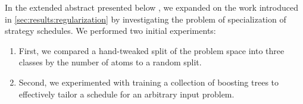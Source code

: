 In the extended abstract presented below \cite{DBLP:conf/paar/BartekC024},
we expanded on the work introduced in \cref{sec:results:regularization}
by investigating the problem of specialization of strategy schedules.
We performed two initial experiments:
\begin{enumerate}
\item First, we compared a hand-tweaked split of the problem space into three classes by the number of atoms to a random split.
\item Second, we experimented with training a collection of boosting trees to effectively tailor a schedule for an arbitrary input problem.
\end{enumerate}

